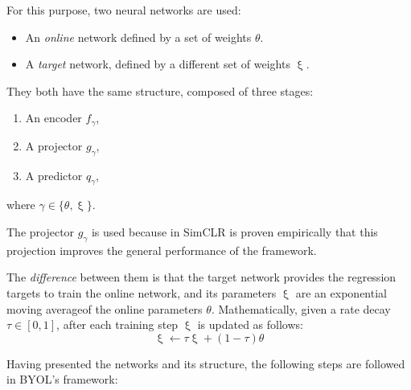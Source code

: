 For this purpose, two neural networks are used:
\begin{itemize}
\item An \emph{online} network defined by a set of weights $\theta$.

\item A \emph{target} network, defined by a different set of weights $\upxi$.
\end{itemize}

They both have the same structure, composed of three stages:
\begin{enumerate}
\item An encoder $f_\gamma$,
\item A projector $g_\gamma$,
\item A predictor $q_\gamma$,
\end{enumerate}
where $\gamma \in \{\theta,\upxi\}$.

\begin{remark}
The projector $g_\gamma$ is used because in SimCLR \citep{chen_simple_2020} is proven empirically that this projection improves the general performance of the framework.
\end{remark}

The \emph{difference} between them is that the target network provides the regression targets to train the online network, and its parameters $\upxi$ are an exponential moving average\footnotemark of the online parameters $\theta$. Mathematically, given a rate decay $\tau \in [0,1]$, after each training step $\upxi$ is updated as follows:
\[
\upxi \leftarrow \tau \upxi + (1-\tau)\theta    
\]


Having presented the networks and its structure, the following steps are followed in BYOL's framework:

